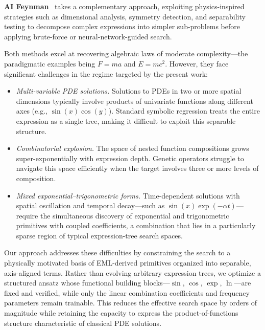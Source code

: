 \textbf{AI Feynman}~\cite{udrescu2020} takes a complementary approach,
exploiting physics-inspired strategies such as dimensional analysis, symmetry
detection, and separability testing to decompose complex expressions into
simpler sub-problems before applying brute-force or neural-network-guided
search.

Both methods excel at recovering algebraic laws of moderate complexity---the
paradigmatic examples being $F = ma$ and $E = mc^{2}$.  However, they face
significant challenges in the regime targeted by the present work:
\begin{itemize}
  \item \emph{Multi-variable PDE solutions.}  Solutions to PDEs in two or more
    spatial dimensions typically involve products of univariate functions along
    different axes (e.g., $\sin(x)\cos(y)$).  Standard symbolic regression
    treats the entire expression as a single tree, making it difficult to
    exploit this separable structure.
  \item \emph{Combinatorial explosion.}  The space of nested function
    compositions grows super-exponentially with expression depth.  Genetic
    operators struggle to navigate this space efficiently when the target
    involves three or more levels of composition.
  \item \emph{Mixed exponential--trigonometric forms.}  Time-dependent
    solutions with spatial oscillation and temporal decay---such as
    $\sin(x)\exp(-\alpha t)$---require the simultaneous discovery of
    exponential and trigonometric primitives with coupled coefficients, a
    combination that lies in a particularly sparse region of typical
    expression-tree search spaces.
\end{itemize}

Our approach addresses these difficulties by constraining the search to a
physically motivated basis of EML-derived primitives organized into separable,
axis-aligned terms.  Rather than evolving arbitrary expression trees, we
optimize a structured ansatz whose functional building blocks---$\sin$, $\cos$,
$\exp$, $\ln$---are fixed and verified, while only the linear combination
coefficients and frequency parameters remain trainable.  This reduces the
effective search space by orders of magnitude while retaining the capacity to
express the product-of-functions structure characteristic of classical PDE
solutions.
